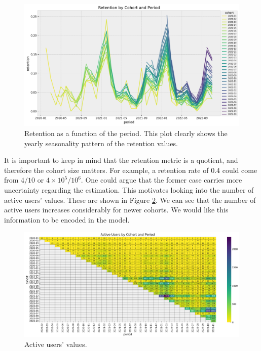 \documentclass[11pt]{amsart}
\begin{document}
\begin{figure}
    \centering
    \includegraphics[width=\textwidth]{images/revenue_retention_19_0.png}
    \caption{Retention as a function of the period. This plot clearly shows the yearly
    seasonality pattern of the retention values.}
    \label{fig:retention_seasonal}
\end{figure}

It is important to keep in mind that the retention metric is a quotient, and therefore
the cohort size matters. For example, a retention rate of 0.4 could come from $4/10$ or
$4\times 10^{5} / 10^{6}$. One could argue that the former case carries more
uncertainty regarding the estimation. This motivates looking into the number of active
users' values. These are shown in Figure \ref{fig:active_users}. We can see that the
number of active users increases considerably for newer cohorts. We would like this
information to be encoded in the model. \\

\begin{figure}
    \centering
    \includegraphics[width=\textwidth]{images/revenue_retention_21_0.png}
    \caption{Active users' values.}
    \label{fig:active_users}
\end{figure}
\end{document}

